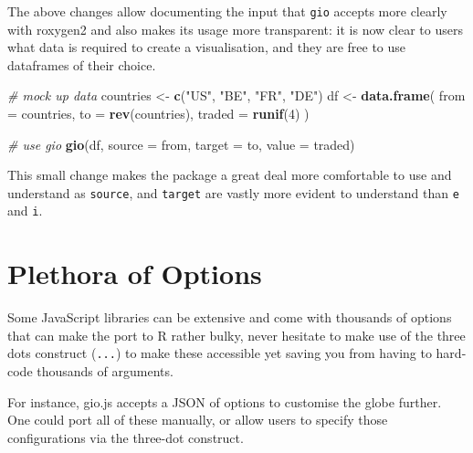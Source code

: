 \documentclass[
  10pt,
]{krantz}
\makeatletter
\newenvironment{Shaded}{\begin{snugshade}}{\end{snugshade}}
\newcommand{\CommentTok}[1]{\textcolor[rgb]{0.37,0.37,0.37}{\textit{#1}}}
\newcommand{\DataTypeTok}[1]{\textcolor[rgb]{0.27,0.27,0.27}{#1}}
\newcommand{\DecValTok}[1]{\textcolor[rgb]{0.06,0.06,0.06}{#1}}
\newcommand{\KeywordTok}[1]{\textcolor[rgb]{0.27,0.27,0.27}{\textbf{#1}}}
\newcommand{\NormalTok}[1]{#1}
\newcommand{\StringTok}[1]{\textcolor[rgb]{0.5,0.5,0.5}{#1}}
\newenvironment{kframe}{%
\medskip{}
\setlength{\fboxsep}{.8em}
 \def\at@end@of@kframe{}%
 \ifinner\ifhmode%
  \def\at@end@of@kframe{\end{minipage}}%
  \begin{minipage}{\columnwidth}%
 \fi\fi%
 \def\FrameCommand##1{\hskip\@totalleftmargin \hskip-\fboxsep
 \colorbox{shadecolor}{##1}\hskip-\fboxsep
     \hskip-\linewidth \hskip-\@totalleftmargin \hskip\columnwidth}%
 \MakeFramed {\advance\hsize-\width
   \@totalleftmargin\z@ \linewidth\hsize
   \@setminipage}}%
 {\par\unskip\endMakeFramed%
 \at@end@of@kframe}
\renewenvironment{Shaded}{\begin{kframe}}{\end{kframe}}
\makeatother
\begin{document}
The above changes allow documenting the input that \texttt{gio} accepts more clearly with roxygen2 and also makes its usage more transparent: it is now clear to users what data is required to create a visualisation, and they are free to use dataframes of their choice.

\begin{Shaded}
\begin{Highlighting}[]
\CommentTok{\# mock up data}
\NormalTok{countries <{-}}\StringTok{ }\KeywordTok{c}\NormalTok{(}\StringTok{"US"}\NormalTok{, }\StringTok{"BE"}\NormalTok{, }\StringTok{"FR"}\NormalTok{, }\StringTok{"DE"}\NormalTok{)}
\NormalTok{df <{-}}\StringTok{ }\KeywordTok{data.frame}\NormalTok{(}
  \DataTypeTok{from =}\NormalTok{ countries,}
  \DataTypeTok{to =} \KeywordTok{rev}\NormalTok{(countries),}
  \DataTypeTok{traded =} \KeywordTok{runif}\NormalTok{(}\DecValTok{4}\NormalTok{)}
\NormalTok{)}

\CommentTok{\# use gio}
\KeywordTok{gio}\NormalTok{(df, }\DataTypeTok{source =}\NormalTok{ from, }\DataTypeTok{target =}\NormalTok{ to, }\DataTypeTok{value =}\NormalTok{ traded)}
\end{Highlighting}
\end{Shaded}

This small change makes the package a great deal more comfortable to use and understand as \texttt{source}, and \texttt{target} are vastly more evident to understand than \texttt{e} and \texttt{i}.

\hypertarget{widgets-final-options}{%
\section{Plethora of Options}\label{widgets-final-options}}

Some JavaScript libraries can be extensive and come with thousands of options that can make the port to R rather bulky, never hesitate to make use of the three dots construct (\texttt{...}) to make these accessible yet saving you from having to hard-code thousands of arguments.

For instance, gio.js accepts a JSON of options to customise the globe further. One could port all of these manually, or allow users to specify those configurations via the three-dot construct.
\end{document}
